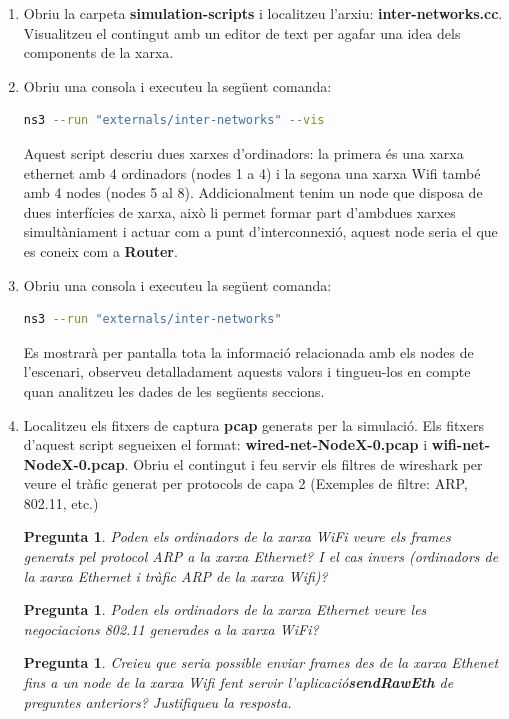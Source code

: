 \documentclass[12pt,a4paper]{article}
\newcounter{exercises}
\newtheorem{exer}[exercises]{Pregunta}
\begin{document}
\begin{enumerate} 
 \item Obriu la carpeta \textbf{simulation-scripts} i localitzeu l'arxiu: \textbf{inter-networks.cc}. Visualitzeu el contingut amb un editor de text per agafar una idea dels components de la xarxa.
  
\item Obriu una consola i executeu la següent comanda:
\begin{lstlisting}[language=bash]
   ns3 --run "externals/inter-networks" --vis
\end{lstlisting}

Aquest script descriu dues xarxes d'ordinadors: la primera és una xarxa ethernet amb 4 ordinadors (nodes 1 a 4) i la segona una xarxa Wifi també amb 4 nodes (nodes 5 al 8).
Addicionalment tenim un node que disposa de dues interfícies de xarxa, això li permet formar part d'ambdues xarxes simultàniament i actuar com a punt d'interconnexió, aquest node seria el que es coneix com a \textbf{Router}.


\item Obriu una consola i executeu la següent comanda:
\begin{lstlisting}[language=bash]
   ns3 --run "externals/inter-networks"
\end{lstlisting}
Es mostrarà per pantalla tota la informació relacionada amb els nodes de l'escenari, observeu
detalladament aquests valors i tingueu-los en compte quan analitzeu les dades de les següents seccions.

\item Localitzeu els fitxers de captura \textbf{pcap} generats per la simulació. Els fitxers d'aquest script segueixen el format: \textbf{wired-net-NodeX-0.pcap} i \textbf{wifi-net-NodeX-0.pcap}.
Obriu el contingut i feu servir els filtres de wireshark per veure el tràfic generat per protocols de capa 2 (Exemples de filtre: ARP, 802.11, etc.)

\begin{exer} Poden els ordinadors de la xarxa WiFi veure els frames generats pel protocol ARP a la xarxa Ethernet? I el cas invers (ordinadors de la xarxa Ethernet i tràfic ARP de la xarxa Wifi)?\end{exer}
\begin{exer} Poden els ordinadors de la xarxa Ethernet veure les negociacions 802.11 generades a la xarxa WiFi?\end{exer}
\begin{exer} Creieu que seria possible enviar frames des de la xarxa Ethenet fins a un node de la xarxa Wifi fent servir l'aplicació\textbf{sendRawEth} de preguntes anteriors? Justifiqueu la resposta.\end{exer}


\end{enumerate}
\end{document}
